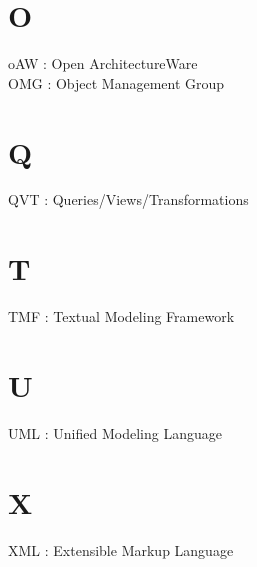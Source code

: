 \section*{O}

oAW : Open ArchitectureWare\\
OMG : Object Management Group\\

\section*{Q}

QVT : Queries/Views/Transformations

\section*{T}

TMF : Textual Modeling Framework

\section*{U}

UML : Unified Modeling Language

\section*{X}

XML : Extensible Markup Language
